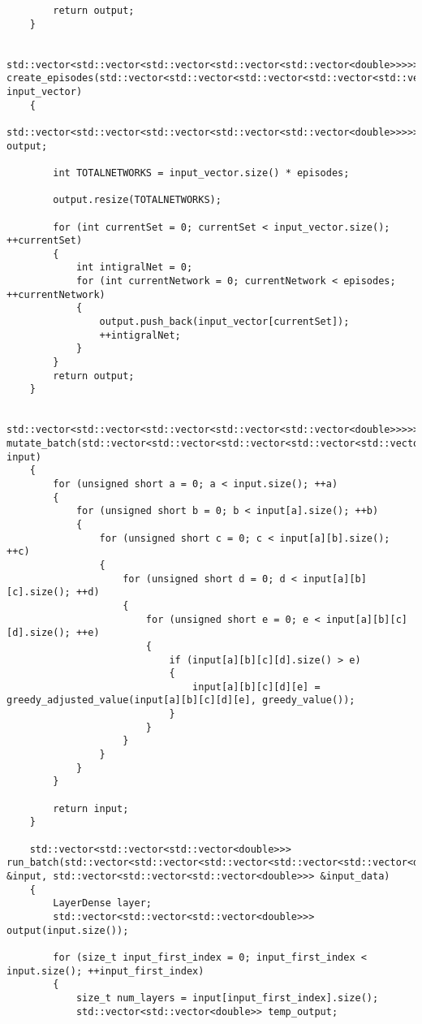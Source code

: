 \begin{verbatim}
        return output;
    }

    std::vector<std::vector<std::vector<std::vector<std::vector<double>>>>> create_episodes(std::vector<std::vector<std::vector<std::vector<std::vector<double>>>>> input_vector)
    {
        std::vector<std::vector<std::vector<std::vector<std::vector<double>>>>> output;

        int TOTALNETWORKS = input_vector.size() * episodes;

        output.resize(TOTALNETWORKS);

        for (int currentSet = 0; currentSet < input_vector.size(); ++currentSet)
        {
            int intigralNet = 0;
            for (int currentNetwork = 0; currentNetwork < episodes; ++currentNetwork)
            {
                output.push_back(input_vector[currentSet]);
                ++intigralNet;
            }
        }
        return output;
    }

    std::vector<std::vector<std::vector<std::vector<std::vector<double>>>>> mutate_batch(std::vector<std::vector<std::vector<std::vector<std::vector<double>>>>> input)
    {
        for (unsigned short a = 0; a < input.size(); ++a)
        {
            for (unsigned short b = 0; b < input[a].size(); ++b)
            {
                for (unsigned short c = 0; c < input[a][b].size(); ++c)
                {
                    for (unsigned short d = 0; d < input[a][b][c].size(); ++d)
                    {
                        for (unsigned short e = 0; e < input[a][b][c][d].size(); ++e)
                        {
                            if (input[a][b][c][d].size() > e)
                            {
                                input[a][b][c][d][e] = greedy_adjusted_value(input[a][b][c][d][e], greedy_value());
                            }
                        }
                    }
                }
            }
        }

        return input;
    }

    std::vector<std::vector<std::vector<double>>> run_batch(std::vector<std::vector<std::vector<std::vector<std::vector<double>>>>> &input, std::vector<std::vector<std::vector<double>>> &input_data)
    {
        LayerDense layer;
        std::vector<std::vector<std::vector<double>>> output(input.size());

        for (size_t input_first_index = 0; input_first_index < input.size(); ++input_first_index)
        {
            size_t num_layers = input[input_first_index].size();
            std::vector<std::vector<double>> temp_output;


\end{verbatim}

